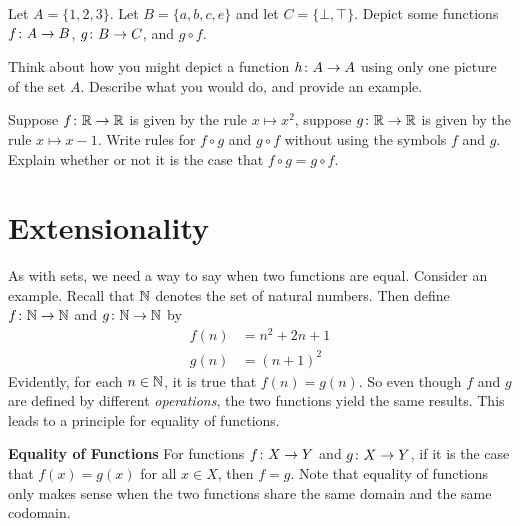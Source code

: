 \begin{exercises}
\begin{nextexercise}
\begin{multicols}{2}
\begin{enumerate}
	  \end{enumerate}
	  \end{multicols}
		\item Let $A = \{1,2,3\}$. Let $B=\{a,b,c,e\}$ and let $C = \{\bot,\top\}$.
		Depict some functions ${f}\colon{A}\to{B}$, ${g}\colon{B}\to{C}$, and $g\circ f$. 
		\item Think about how you might depict a function ${h}\colon{A}\to{A}$ using only one picture of the set $A$.
		Describe what you would do, and provide an example.
		\item Suppose ${f}\colon{\mathbb R}\to{\mathbb R}$ is given by the rule $x\mapsto x^2$, suppose ${g}\colon{\mathbb R}\to{\mathbb R}$ is given
		by the rule $x\mapsto x-1$. Write rules for $f\circ g$ and $g\circ f$ without using the symbols $f$ and $g$. Explain whether or not it is the case that $f\circ g = g\circ f$.
	\end{nextexercise}
\end{exercises}

\section{Extensionality}

As with sets, we need a way to say when two functions are equal. Consider an example.
Recall that $\mathbb N$ denotes the set of natural numbers. 
Then define ${f}\colon{\mathbb N}\to{\mathbb N}$ and ${g}\colon{\mathbb N}\to{\mathbb N}$ by
\begin{align*}
f(n) &= n^2 +  2n + 1\\
g(n) &= (n+1)^2
\end{align*}
Evidently, for each $n\in\mathbb N$, it is true that $f(n) = g(n)$.
So even though $f$ and $g$ are defined by different \emph{operations}, the two functions yield the same results.
This leads to a principle for equality of functions.

\begin{principle}
	\noindent\textbf{Equality of Functions}
	For functions ${f}\colon{X}\to{Y}$ and ${g}\colon{X}\to{Y}$, if it is the case that $f(x)=g(x)$ for all $x\in X$, then $f=g$.
	Note that equality of functions only makes sense when the two functions share the same domain and the same codomain.
\end{principle}

